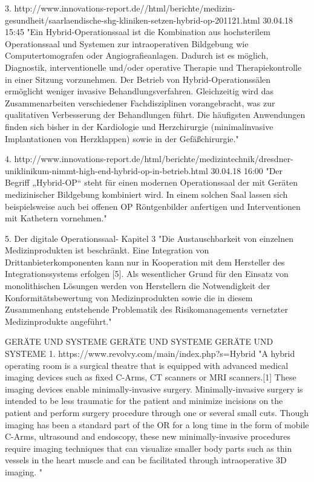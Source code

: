 3. http://www.innovations-report.de//html/berichte/medizin-gesundheit/saarlaendische-shg-kliniken-setzen-hybrid-op-201121.html 30.04.18 15:45	
	"Ein Hybrid-Operationssaal ist die Kombination aus hochsterilem Operationssaal und Systemen zur intraoperativen Bildgebung wie Computertomografen oder Angiografieanlagen. Dadurch ist es möglich, Diagnostik, interventionelle und/oder operative Therapie und Therapiekontrolle in einer Sitzung vorzunehmen.
	Der Betrieb von Hybrid-Operationssälen ermöglicht weniger invasive Behandlungsverfahren. Gleichzeitig wird das Zusammenarbeiten verschiedener Fachdisziplinen vorangebracht, was zur qualitativen Verbesserung der Behandlungen führt. Die häufigsten Anwendungen finden sich bisher in der Kardiologie und Herzchirurgie (minimalinvasive Implantationen von Herzklappen) sowie in der Gefäßchirurgie."
	
4. http://www.innovations-report.de/html/berichte/medizintechnik/dresdner-uniklinikum-nimmt-high-end-hybrid-op-in-betrieb.html 30.04.18 16:00
	"Der Begriff „Hybrid-OP“ steht für einen modernen Operationssaal der mit Geräten medizinischer Bildgebung kombiniert wird. In einem solchen Saal lassen sich beispielsweise auch bei offenen OP Röntgenbilder anfertigen und Interventionen mit Kathetern vornehmen."

5. Der digitale Operationssaal- Kapitel 3
	"Die Austauschbarkeit
	von einzelnen Medizinprodukten ist beschränkt. Eine Integration von Drittanbieterkomponenten
	kann nur in Kooperation mit dem Hersteller des Integrationssystems
	erfolgen [5]. Als wesentlicher Grund für den Einsatz von monolithischen Lösungen
	werden von Herstellern die Notwendigkeit der Konformitätsbewertung von Medizinprodukten
	sowie die in diesem Zusammenhang entstehende Problematik des Risikomanagements
	vernetzter Medizinprodukte angeführt."
	
	
	GERÄTE UND SYSTEME  GERÄTE UND SYSTEME  GERÄTE UND SYSTEME
	1. https://www.revolvy.com/main/index.php?s=Hybrid%
	"A hybrid operating room is a surgical theatre that is equipped with advanced medical imaging devices such as fixed C-Arms, CT scanners or MRI scanners.[1]
	These imaging devices enable minimally-invasive surgery. Minimally-invasive surgery is intended to be less traumatic for the patient and minimize incisions on the patient and perform surgery procedure through one or several small cuts.
	Though imaging has been a standard part of the OR for a long time in the form of mobile C-Arms, ultrasound and endoscopy, these new minimally-invasive procedures require imaging techniques that can visualize smaller body parts such as thin vessels in the heart muscle and can be facilitated through intraoperative 3D imaging. "
	
